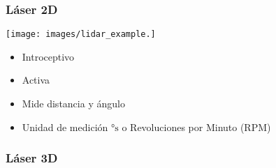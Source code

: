 \begin{frame}
    \frametitle{Láser 2D}

    
    \texttt{[image: images/lidar\_example.]}
    
    \begin{itemize}
        \item Introceptivo
        \item Activa
        \item Mide distancia y ángulo
        \item Unidad de medición $\si{\degree\second}$ o Revoluciones por Minuto (RPM)
    \end{itemize}

\end{frame}

\begin{frame}
    \frametitle{Láser 3D}

\end{frame}